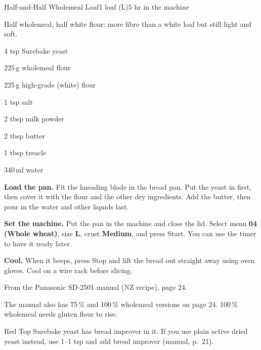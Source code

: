 \begin{recipebox}{Half-and-Half Wholemeal Loaf}{1 loaf (L)}{5 hr in the machine}

Half wholemeal, half white flour: more fibre than a white loaf but still light and soft.

\begin{ingredients}
  \item 4 tsp Surebake yeast
  \item 225\,g wholemeal flour
  \item 225\,g high-grade (white) flour
  \item 1 tsp salt
  \item 2 tbsp milk powder
  \item 2 tbsp butter
  \item 1 tbsp treacle
  \item 340\,ml water
\end{ingredients}

\begin{method}
  \item \textbf{Load the pan.} Fit the kneading blade in the bread pan. Put the yeast in first, then cover it with the flour and the other dry ingredients. Add the butter, then pour in the water and other liquids last.
  \item \textbf{Set the machine.} Put the pan in the machine and close the lid. Select menu \textbf{04 (Whole wheat)}, size \textbf{L}, crust \textbf{Medium}, and press Start. You can use the timer to have it ready later.
  \item \textbf{Cool.} When it beeps, press Stop and lift the bread out straight away using oven gloves. Cool on a wire rack before slicing.
\end{method}

\begin{notelist}
  \item From the Panasonic SD-2501 manual (NZ recipe), page 24.
  \item The manual also has 75\,\% and 100\,\% wholemeal versions on page 24. 100\,\% wholemeal needs gluten flour to rise.
  \item Red Top Surebake yeast has bread improver in it. If you use plain active dried yeast instead, use 1--1 tsp and add bread improver (manual, p.~21).
\end{notelist}

\end{recipebox}
